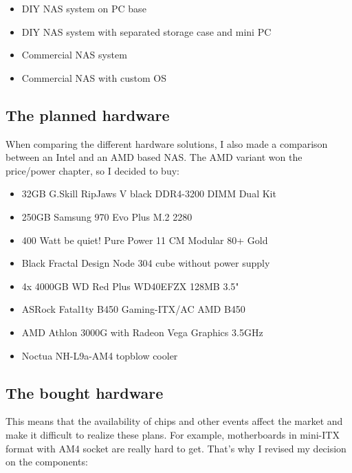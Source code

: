 \begin{itemize}
    \item DIY \gls{NAS} system on PC base
    \item DIY \gls{NAS} system with separated storage case and mini PC
    \item Commercial \gls{NAS} system
    \item Commercial \gls{NAS} with custom OS
\end{itemize}

\subsection{The planned hardware}

When comparing the different hardware solutions, I also made a comparison
between an Intel and an AMD based \gls{NAS}. The AMD variant won the price/power
chapter, so I decided to buy:

\begin{itemize}
    \item 32GB G.Skill RipJaws V black DDR4-3200 DIMM Dual Kit
    \item 250GB Samsung 970 Evo Plus M.2 2280
    \item 400 Watt be quiet! Pure Power 11 CM Modular 80+ Gold
    \item Black Fractal Design Node 304 cube without power supply
    \item 4x 4000GB WD Red Plus WD40EFZX 128MB 3.5"
    \item ASRock Fatal1ty B450 Gaming-ITX/AC AMD B450
    \item AMD Athlon 3000G with Radeon Vega Graphics 3.5GHz
    \item Noctua NH-L9a-AM4 topblow cooler
\end{itemize}

\subsection{The bought hardware}


This means that the availability of chips and other events affect the market
and make it difficult to realize these plans. For example, motherboards in
mini-ITX format with AM4 socket are really hard to get. That's why I revised
my decision on the components:

